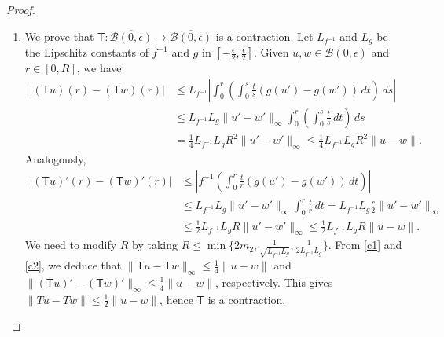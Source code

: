 \documentclass[preprint,11pt]{elsarticle}
\theoremstyle{definition}
\begin{document}
\begin{proof}
\begin{enumerate}
\begin{equation*}
|( \mathsf{T} u)(r)| \leq \int_0^r f^{-1}\left(\int_0^s\frac{t}{s}\, dt\right)\, ds 
\leq \int_0^r f^{-1}\left(\frac{s}{2}\right)\, ds \leq \frac{\epsilon}{2}r\leq\frac{\epsilon}{2}.
\end{equation*}
 Thus $\| \mathsf{T} u\|_\infty\leq\frac{\epsilon}{2}$. Similarly, we have
\begin{equation*}
 |( \mathsf{T} u)'|\leq f^{-1}\left(\left|\int_0^r\frac{t}{r}g(u'(t))\, dt\right|\right)\leq \left| f^{-1} (\frac{r}{2} )\right| \leq\frac{\epsilon}{2}.
\end{equation*}
 Then $\|( \mathsf{T} u)'\|_\infty\leq \frac{\epsilon}{2}$, proving  that $\| \mathsf{T} u \|\leq \epsilon$. 
\item We prove that $ \mathsf{T}\colon \overline{\mathcal{B}(0,\epsilon)}\to \overline{\mathcal{B}(0,\epsilon)}$ is a contraction.
 Let $L_{ f^{-1}}$ and $L_g$ be the Lipschitz constants of $ f^{-1}$ and $g$ in  $[-\frac{\epsilon}{2},\frac{\epsilon}{2}]$.  Given $u,w\in \overline{\mathcal{B}(0,\epsilon)}$ and $r\in [0,R]$, we have
\begin{equation}\label{c1}
\begin{split}
|( \mathsf{T} u)(r)-( \mathsf{T}w)(r)|&\leq L_{ f^{-1}} \left|\int_0^r \left(\int_0^s\frac{t}{s}(g(u')-g(w'))\, dt\right) \, ds\right|\\
 & \leq L_{ f^{-1}}L_g \|u'-w'\|_\infty\int_0^r(\int_0^s\frac{t}{s}\, dt)\, ds\\
 &=\frac14 L_{ f^{-1}}L_g  R^2  \|u'-w'\|_\infty\leq \frac14 L_{ f^{-1}}L_g  R^2  \|u-w\|.
\end{split}
\end{equation}
Analogously, 
\begin{equation}\label{c2}
\begin{split}
|( \mathsf{T} u)'(r)-( \mathsf{T}w)'(r)| &\leq \left| f^{-1}\left(\int_0^r \frac{t}{r}(g(u')-g(w'))\, dt\right)\right|\\
&\leq L_{ f^{-1}}L_g \|u'-w'\|_\infty \int_0^r \frac{t}{r}\, dt= L_{ f^{-1}}L_g \frac{r}{2} \|u'-w'\|_\infty \\
&\leq \frac12 L_{ f^{-1}}L_g  R \|u'-w'\|_\infty\leq \frac12 L_{ f^{-1}}L_g R\|u-w\|.
 \end{split}
\end{equation}
We need to modify $R$ by taking  
$R\leq \min\{2m_2,\frac{1}{\sqrt{ L_{ f^{-1}}L_g}},\frac{1}{ 2L_{ f^{-1}}L_g}\}.$
From \eqref{c1} and \eqref{c2}, we deduce that $\|\mathsf{T} u-\mathsf{T}w\|_\infty\leq\frac14\|u-w\|$ and $\|(\mathsf{T} u)'-(\mathsf{T}w)'\|_\infty\leq\frac14\|u-w\|$, respectively. This gives $\| Tu-Tw\|\leq \frac12\|u-w\|$, hence $\mathsf{T}$ is a contraction.


\end{enumerate}
\end{proof}
\end{document}
